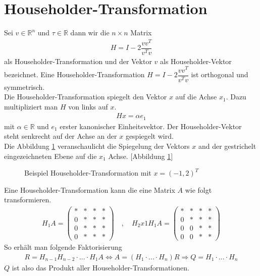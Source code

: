\section{Householder-Transformation}
Sei $v \in \mathbb{R}^n$ und $\tau \in \mathbb{R}$ dann wir die $n \times n$ Matrix 
\begin{align}
	H = I - 2 \dfrac{vv^T}{v^Tv}
\end{align}
als Householder-Transformation und der Vektor $v$ als Householder-Vektor bezeichnet.
Eine Householder-Transformation $H = I - 2 \dfrac{vv^T}{v^Tv}$ ist orthogonal und symmetrisch. \cite{num1}\\
Die Householder-Transformation spiegelt den Vektor $x$ auf die Achse $x_1$.
Dazu multipliziert man $H$ von links auf $x$.
\begin{align}
	Hx=\alpha e_1 \label{spiegelung}
\end{align}
mit $\alpha \in \mathbb{R}$ und $e_1$ erster kanonischer Einheitsvektor. Der Householder-Vektor steht senkrecht auf der Achse an der $x$ gespiegelt wird.\\
Die Abbildung \ref{fig:HHolder} veranschaulicht die Spiegelung der Vektors $x$ and der gestrichelt eingezeichneten Ebene auf die $x_1$ Achse.
[Abbildung \ref{fig:HHolder}]
\begin{figure}[h]
	\centering
	
	\caption{Beispiel Householder-Transformation mit $x=(-1,2)^T$}
	\label{fig:HHolder}
\end{figure}

Eine Householder-Transformation kann die eine Matrix $A$ wie folgt transformieren.
\begin{align*}
	H_1 A= \left( 
	\begin{array}{cccc}
	* & * & * & * \\ 
	0 & * & * & * \\ 
	0 & * & * & * \\ 
	0 & * & * & *
	\end{array}
	\right)
	\quad , \quad
	H_2x1 H_1 A= \left( 
	\begin{array}{cccc}
	* & * & * & * \\ 
	0 & * & * & * \\ 
	0 & 0 & * & * \\ 
	0 & 0 & * & *
	\end{array}
	\right)
\end{align*} 
So erhält man folgende Faktorisierung
\begin{align*}
	R = H_{n-1} H_{n-2}\cdot ...\cdot H_1 A \Leftrightarrow A = (H_1\cdot ...\cdot H_n)R \Rightarrow Q = H_1\cdot ... \cdot H_n
\end{align*}
$Q$ ist also das Produkt aller Householder-Transformationen.


